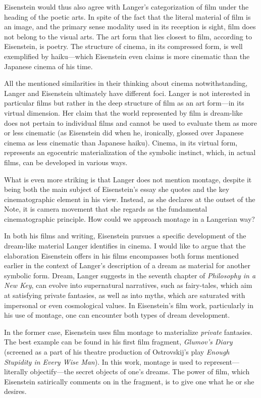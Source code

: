\documentclass{tufte-handout}
\begin{document}
Eisenstein would thus also agree with Langer's categorization of film
under the heading of the poetic arts. In spite of the fact that the
literal material of film is an image, and the primary sense modality
used in its reception is sight, film does not belong to the visual arts.
The art form that lies closest to film, according to Eisenstein, is
poetry. The structure of cinema, in its compressed form, is well
exemplified by haiku---which Eisenstein even claims is more cinematic
than the Japanese cinema of his time.

All the mentioned similarities in their thinking about cinema
notwithstanding, Langer and Eisenstein ultimately have different foci.
Langer is not interested in particular films but rather in the deep
structure of film as an art form---in its virtual dimension. Her claim
that the world represented by film is dream-like does not pertain to
individual films and cannot be used to evaluate them as more or less
cinematic (as Eisenstein did when he, ironically, glossed over Japanese
cinema as less cinematic than Japanese haiku). Cinema, in its virtual
form, represents an egocentric materialization of the symbolic instinct,
which, in actual films, can be developed in various ways.

What is even more striking is that Langer does not mention montage,
despite it being both the main subject of Eisenstein's essay she quotes
and the key cinematographic element in his view. Instead, as she
declares at the outset of the Note, it is camera movement that she
regards as the fundamental cinematographic principle. How could we
approach montage in a Langerian way?

In both his films and writing, Eisenstein pursues a specific development
of the dream-like material Langer identifies in cinema. I would like to
argue that the elaboration Eisenstein offers in his films encompasses
both forms mentioned earlier in the context of Langer's description of a
dream as material for another symbolic form. Dream, Langer suggests in
the seventh chapter of \emph{Philosophy in a New Key}, can evolve into
supernatural narratives, such as fairy-tales, which aim at satisfying
private fantasies, as well as into myths, which are saturated with
impersonal or even cosmological values. In Eisenstein's film work,
particularly in his use of montage, one can encounter both types of
dream development.

In the former case, Eisenstein uses film montage to materialize
\emph{private} fantasies. The best example can be found in his first
film fragment, \emph{Glumov's Diary} (screened as a part of his theatre
production of Ostrovskij's play \emph{Enough Stupidity in Every Wise
Man}). In this work, montage is used to represent---literally
objectify---the secret objects of one's dreams. The power of film, which
Eisenstein satirically comments on in the fragment, is to give one what
he or she desires.
\end{document}

